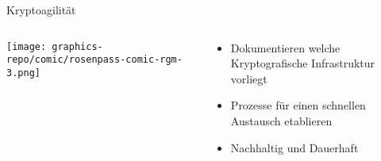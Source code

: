 
\begin{frame}[T]{Kryptoagilität}
  \begin{columns}[T,fullwidth]
    \hfill
    \begin{column}{.30\linewidth}
      \texttt{[image: graphics-repo/comic/rosenpass-comic-rgm-3.png]}
    \end{column}
    \begin{column}{.65\linewidth}
      \vspace{5em}
      \begin{itemize}
        \item Dokumentieren welche Kryptografische Infrastruktur vorliegt
        \vspace{1.2em}
        \item Prozesse für einen schnellen Austausch etablieren
        \vspace{1.2em}
        \item Nachhaltig und Dauerhaft
      \end{itemize}
    \end{column}
    \hfill
  \end{columns}
\end{frame}
